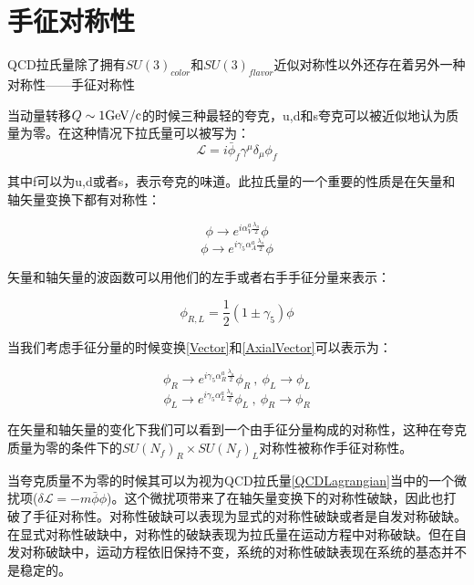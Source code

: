 \section{手征对称性}

QCD拉氏量除了拥有$SU(3)_{color}$和$SU(3)_{flavor}$近似对称性以外还存在着另外一种对称性——手征对称性

当动量转移$Q \sim 1 {\rm GeV/c}$的时候三种最轻的夸克，u,d和s夸克可以被近似地认为质量为零。在这种情况下拉氏量可以被写为：
\begin{equation}
    \label{QCDLagrangian}
    \mathcal{L} = i\bar{\phi}_f \gamma^{\mu} \delta_{\mu} \phi_{f}
\end{equation}

其中f可以为u,d或者s，表示夸克的味道。此拉氏量的一个重要的性质是在矢量和轴矢量变换下都有对称性：

\begin{equation}
    \label{Vector}
    \phi \rightarrow e^{i \alpha^{a}_{V}\frac{\lambda_a}{2}} \phi
\end{equation}
\begin{equation}
    \label{AxialVector}
    \phi \rightarrow e^{i \gamma_5 \alpha^{a}_{A}\frac{\lambda_a}{2}} \phi
\end{equation}

矢量和轴矢量的波函数可以用他们的左手或者右手手征分量来表示：

\begin{equation}
    \phi_{R,L} = \frac{1}{2}(1 \pm \gamma_5) \phi
\end{equation}

当我们考虑手征分量的时候变换\ref{Vector}和\ref{AxialVector}可以表示为：

\begin{equation}
    \phi_R \rightarrow e^{i \gamma_5 \alpha^{a}_{R}\frac{\lambda_a}{2}} \phi_R~,~\phi_L \rightarrow \phi_L
\end{equation}
\begin{equation}
    \phi_L \rightarrow e^{i \gamma_5 \alpha^{a}_{L}\frac{\lambda_a}{2}} \phi_L~,~\phi_R \rightarrow \phi_R
\end{equation}

在矢量和轴矢量的变化下我们可以看到一个由手征分量构成的对称性，这种在夸克质量为零的条件下的$SU(N_f)_{R} \times SU(N_f)_{L}$对称性被称作手征对称性。

当夸克质量不为零的时候其可以为视为QCD拉氏量\ref{QCDLagrangian}当中的一个微扰项($\delta\mathcal{L} = -m\bar{\phi}\phi$)。这个微扰项带来了在轴矢量变换下的对称性破缺，因此也打破了手征对称性。对称性破缺可以表现为显式的对称性破缺或者是自发对称破缺。在显式对称性破缺中，对称性的破缺表现为拉氏量在运动方程中对称破缺。但在自发对称破缺中，运动方程依旧保持不变，系统的对称性破缺表现在系统的基态并不是稳定的。

